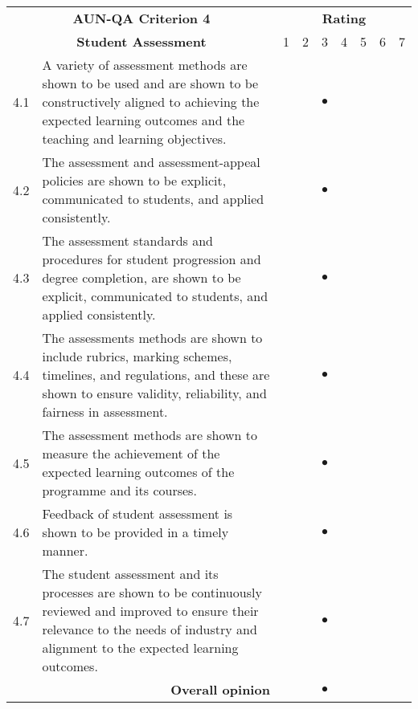 \begin{longtable}{|c| p{}|p{0.3cm}|p{0.3cm}|c|p{0.3cm}|p{0.3cm}|p{0.3cm}|p{0.3cm}|}
	\hline
	\multicolumn{2}{|c|}{\bf AUN-QA Criterion 4}&\multicolumn{7}{c|}{\bf Rating}\\\cline{3-9}
	\multicolumn{2}{|c|}{\bf Student Assessment}&1&2&3&4&5&6&7\\\hline
	\endhead

4.1&A variety of assessment methods are shown to be used and are shown to be constructively aligned to achieving the expected learning outcomes and the teaching and learning objectives. &&& {\huge{$\bullet$}}&&&&\\\hline

4.2&The assessment and assessment-appeal policies are shown to be explicit, communicated to students, and applied consistently.&&& {\huge{$\bullet$}}&&&&\\\hline

4.3&The assessment standards and procedures for student progression and degree completion, are shown to be explicit, communicated to students, and applied consistently. &&& {\huge{$\bullet$}}&&&&\\\hline

4.4&The assessments methods are shown to include rubrics, marking schemes, timelines, and regulations, and these are shown to ensure validity, reliability, and fairness in assessment.  &&& {\huge{$\bullet$}}&&&&\\\hline

4.5&The assessment methods are shown to measure the achievement of the expected learning outcomes of the programme and its courses.&&& {\huge{$\bullet$}}&&&&\\\hline

4.6&Feedback of student assessment is shown to be provided in a timely manner.&&& {\huge{$\bullet$}}&&&&\\\hline

4.7&The student assessment and its processes are shown to be continuously reviewed and improved to ensure their relevance to the needs of industry and alignment to the expected learning outcomes.&&& {\huge{$\bullet$}}&&&&\\\hline 
	
\multicolumn{2}{|r|}{\bf Overall opinion}&&& {\huge{$\bullet$}}&&&&\\\hline 
\end{longtable}

